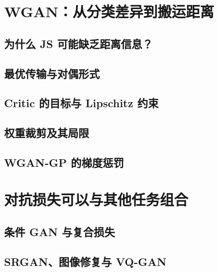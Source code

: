 \section{WGAN：从分类差异到搬运距离}
\label{sec:gan-wgan}
\contentplaceholder

\subsection{为什么 JS 可能缺乏距离信息？}
\label{subsec:gan-support}
\contentplaceholder

\subsection{最优传输与对偶形式}
\label{subsec:gan-transport}
\contentplaceholder

\subsection{Critic 的目标与 Lipschitz 约束}
\label{subsec:gan-critic}
\contentplaceholder

\subsection{权重裁剪及其局限}
\label{subsec:gan-clipping}
\contentplaceholder

\subsection{WGAN-GP 的梯度惩罚}
\label{subsec:gan-gradient-penalty}
\contentplaceholder

\section{对抗损失可以与其他任务组合}
\label{sec:gan-applications}
\contentplaceholder

\subsection{条件 GAN 与复合损失}
\label{subsec:gan-conditional}
\contentplaceholder

\subsection{SRGAN、图像修复与 VQ-GAN}
\label{subsec:gan-restoration}
\contentplaceholder

